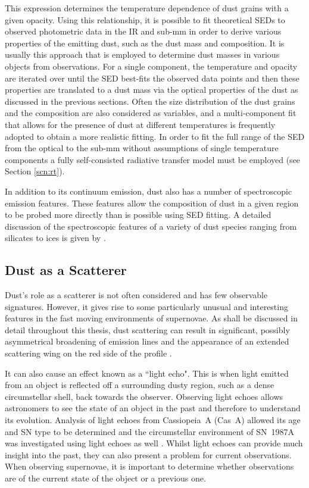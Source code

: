 \noindent This expression determines the temperature dependence of dust grains with a given opacity. Using this relationship, it is possible to fit theoretical SEDs to  observed photometric data in the IR and sub-mm in order to derive various properties of the emitting dust, such as the dust mass and composition.  It is usually this approach that is employed to determine dust masses in various objects from observations.  For a single component, the temperature and opacity are iterated over until the SED best-fits the observed data points and then these properties are translated to a dust mass via the optical properties of the dust as discussed in the previous sections.  Often the size distribution of the dust grains and the composition are also considered as variables, and a multi-component fit that allows for the presence of dust at different temperatures is frequently adopted to obtain a  more realistic fitting.  In order to fit  the full range of the SED from the optical to the sub-mm without assumptions of single temperature components  a fully self-consisted radiative transfer model must be employed (see Section \ref{scn:rt}).

In addition to its continuum emission, dust also has a number of spectroscopic emission features.  These features allow the composition of dust in a given region to be probed more directly than is possible using SED fitting.  A detailed discussion of the spectroscopic features of a variety of dust species ranging from silicates to ices is given by \citet{Draine2003}. 

\subsection{Dust as a Scatterer}

Dust's role as a scatterer is not often considered and has few observable signatures.  However, it gives rise to some particularly unusual and interesting features in the fast moving environments of supernovae.  As shall be discussed in detail throughout this thesis, dust scattering can result in significant, possibly asymmetrical broadening of emission lines and the appearance of an extended scattering wing on the red side of the profile \citep{Lucy1989}. 

 It can also cause an effect known as a ``light echo".  This is when light emitted from an object is reflected off a surrounding dusty region, such as a dense circumstellar shell, back towards the observer. Observing light echoes allows astronomers to see the state of an object in the past and therefore to understand its evolution.  Analysis of light echoes from Cassiopeia~A (Cas~A) allowed its age and SN type to be determined \citep{Krause2008} and the circumstellar environment of SN~1987A was investigated using light echoes as well \citep{Sugerman2005}.  Whilst light echoes can provide much insight into the past, they can also present a problem for current observations.  When observing supernovae, it is important to determine whether observations are of the current state of the object or a previous one.

